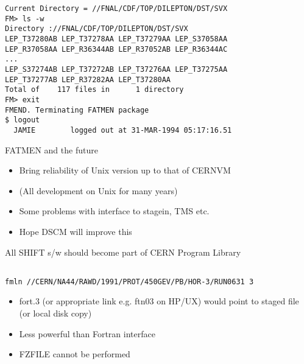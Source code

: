 \begin{slide}
\begin{footnotesize}
\begin{verbatim}
Current Directory = //FNAL/CDF/TOP/DILEPTON/DST/SVX
FM> ls -w
Directory ://FNAL/CDF/TOP/DILEPTON/DST/SVX
LEP_T37280AB LEP_T37278AA LEP_T37279AA LEP_S37058AA 
LEP_R37058AA LEP_R36344AB LEP_R37052AB LEP_R36344AC
...
LEP_S37274AB LEP_T37272AB LEP_T37276AA LEP_T37275AA
LEP_T37277AB LEP_R37282AA LEP_T37280AA 
Total of    117 files in      1 directory  
FM> exit
FMEND. Terminating FATMEN package
$ logout
  JAMIE        logged out at 31-MAR-1994 05:17:16.51
\end{verbatim}
\end{footnotesize}
\end{slide}
\begin{slide}
\begin{center}FATMEN and the future\end{center}

\begin{itemize}
\item
Bring reliability of Unix version up to that of CERNVM
\item
(All development on Unix for many years)
\item
Some problems with interface to stagein, TMS etc.
\item
Hope DSCM will improve this
\end{itemize}

All SHIFT s/w should become part of CERN Program Library
\end{slide}

\begin{slide}
\begin{footnotesize}
\begin{verbatim}

fmln //CERN/NA44/RAWD/1991/PROT/450GEV/PB/HOR-3/RUN0631 3

\end{verbatim}
\end{footnotesize}

\begin{itemize}
\item
fort.3 (or appropriate link e.g. ftn03 on HP/UX) would
point to staged file (or local disk copy)
\item
Less powerful than Fortran interface
\item
FZFILE cannot be performed
\end{itemize}
\end{slide}

